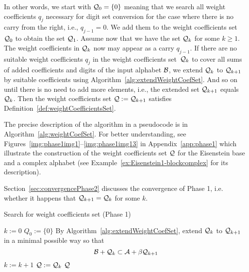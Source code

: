 \begin{upravit}
In other words, we start with $\mathcal{Q}_0=\{0\}$ meaning that we search all weight coefficients $q_j$ necessary for digit set conversion for the case where there is no carry from the right, i.e., $q_{j-1}=0$. We add them to the weight coefficients set $\mathcal{Q}_0$ to obtain the set $\mathcal{Q}_1$. Assume now that we have the set $\mathcal{Q}_k$ for some $k\geq 1$. The weight coefficients in $\mathcal{Q}_k$ now may appear as a carry $q_{j-1}$. If there are no suitable weight coefficients $q_j$ in the weight coefficients set~$\mathcal{Q}_k$ to cover all sums of added coefficients and digits of the input alphabet $\mathcal{B}$, we extend $\mathcal{Q}_k$ to $\mathcal{Q}_{k+1}$ by  suitable coefficients using Algorithm~\ref{alg:extendWeightCoefSet}. And so on until there is no need to add more elements, i.e., the extended set $\mathcal{Q}_{k+1}$ equals $\mathcal{Q}_k$. Then the weight coefficients set $\mathcal{Q}:=\mathcal{Q}_{k+1}$ satisfies Definition~\ref{def:weightCoefficientsSet}. 
    
The precise description of the algorithm in a pseudocode is in Algorithm~\ref{alg:weightCoefSet}. For better understanding, see Figures~\ref{img:phase1img1}--\ref{img:phase1img13} in Appendix~\ref{app:phase1} which illustrate the construction of the weight coefficients set $\mathcal{Q}$ for the Eisenstein base and a complex alphabet (see Example~\ref{ex:Eisenstein1-blockcomplex} for its description). 

Section~\ref{sec:convergencePhase2} discusses the convergence of Phase 1, i.e. whether it happens that  $\mathcal{Q}_{k+1}=\mathcal{Q}_k$ for some  $k$.
    
\begin{algorithm}
  \caption{Search for weight coefficients set (Phase 1)}
    \label{alg:weightCoefSet}
  \begin{algorithmic}[1]
    \STATE $k:=0$ 
    \STATE $Q_0:=\{0\}$
    \REPEAT
     \STATE  By Algorithm~\ref{alg:extendWeightCoefSet}, extend $\mathcal{Q}_k$ to $\mathcal{Q}_{k+1}$ in a minimal possible way so that $$\mathcal{B}+ \mathcal{Q}_k \subset \mathcal{A} + \beta \mathcal{Q}_{k+1}$$
     \vspace{-20pt}
      \STATE  $k:=k+1$
      \STATE $\mathcal{Q}:=\mathcal{Q}_k$
    \RETURN $\mathcal{Q}$
  \end{algorithmic}
\end{algorithm}




    


\end{upravit}
